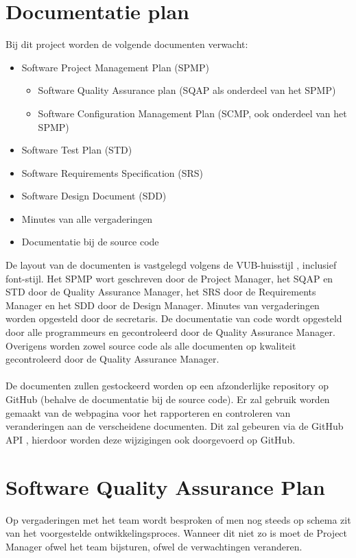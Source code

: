 \section{Documentatie plan} \label{sec:DocumentationPlan} %
Bij dit project worden de volgende documenten verwacht:
\begin{itemize}
	\item Software Project Management Plan (SPMP)
	    \begin{itemize}
	        \item Software Quality Assurance plan (SQAP als onderdeel van het SPMP)
	        \item Software Configuration Management Plan (SCMP, ook onderdeel van het SPMP)
	    \end{itemize}
	\item Software Test Plan (STD)
	\item Software Requirements Specification (SRS)
	\item Software Design Document (SDD)
	\item Minutes van alle vergaderingen
	\item Documentatie bij de source code
\end{itemize}
De layout van de documenten is vastgelegd volgens de VUB-huisstijl \cite{VUBHuisstijl}, inclusief font-stijl. Het SPMP wort geschreven door de Project Manager, het SQAP en STD door de Quality Assurance Manager, het SRS door de Requirements Manager en het SDD door de Design Manager. Minutes van vergaderingen worden opgesteld door de secretaris. De documentatie van code wordt opgesteld door alle programmeurs en gecontroleerd door de Quality Assurance Manager. Overigens worden zowel source code als alle documenten op kwaliteit gecontroleerd door de Quality Assurance Manager. 
\\
\\
De documenten zullen gestockeerd worden op een afzonderlijke repository op GitHub (behalve de documentatie bij de source code). Er zal gebruik worden gemaakt van de webpagina \cite{portalWebsite} voor het rapporteren en controleren van veranderingen aan de verscheidene documenten. Dit zal gebeuren via de GitHub API \cite{GitHubAPI}, hierdoor worden deze wijzigingen ook doorgevoerd op GitHub.

\section{Software Quality Assurance Plan}
Op vergaderingen met het team wordt besproken of men nog steeds op schema zit van het voorgestelde ontwikkelingsproces. 
Wanneer dit niet zo is moet de Project Manager ofwel het team bijsturen, ofwel de verwachtingen veranderen.
\\
\\

